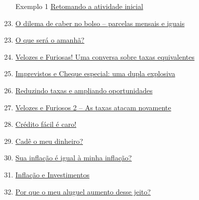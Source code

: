 \begin{apresentacao}
\begin{multicols}{2}
\begin{enumerate}[label=Atividade \arabic* --, wide]\setcounter{enumi}{21}
\item[Exemplo 1] \hyperref[fin-exemp-1]{Retomando a atividade inicial}
\item \hyperref[fin-ativ-22]{O dilema de caber no bolso -- parcelas mensais e iguais}
\end{enumerate}

\begin{enumerate}[label=Atividade \arabic* --, wide]\setcounter{enumi}{22}
\item \hyperref[fin-ativ-23]{O que será o amanhã?}
\end{enumerate}
\vspace{1em}

\begin{enumerate}[label=Atividade \arabic* --, wide]\setcounter{enumi}{23}
\item \hyperref[fin-ativ-24]{Velozes e Furiosas! Uma conversa sobre taxas equivalentes}
\end{enumerate}


\begin{enumerate}[label=Atividade \arabic* --, wide]\setcounter{enumi}{24}
\item \hyperref[fin-ativ-25]{Imprevistos e Cheque especial: uma dupla explosiva}
\item \hyperref[fin-ativ-26]{Reduzindo taxas e ampliando oportunidades}
\item \hyperref[fin-ativ-27]{Velozes e Furiosos 2 -- As taxas atacam novamente}
\item \hyperref[fin-ativ-28]{Crédito fácil é caro!}
\end{enumerate}
\vspace{1em}

\begin{enumerate}[label=Atividade \arabic* --, wide]\setcounter{enumi}{28}
\item \hyperref[fin-ativ-29]{Cadê o meu dinheiro?}
\item \hyperref[fin-ativ-30]{Sua inflação é igual à minha inflação?}
\item \hyperref[fin-ativ-31]{Inflação e Investimentos}
\item \hyperref[fin-ativ-32]{Por que o meu aluguel aumento desse jeito?}
\end{enumerate}


\end{multicols}
\end{apresentacao}
